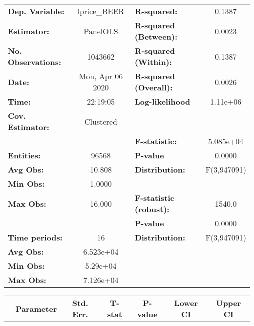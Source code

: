 \documentclass{report}
\begin{document}
\begin{center}
\begin{tabular}{lclc}
\toprule
\textbf{Dep. Variable:}    &    lprice\_BEER    & \textbf{  R-squared:         }   &      0.1387      \\
\textbf{Estimator:}        &      PanelOLS      & \textbf{  R-squared (Between):}  &      0.0023      \\
\textbf{No. Observations:} &      1043662       & \textbf{  R-squared (Within):}   &      0.1387      \\
\textbf{Date:}             &  Mon, Apr 06 2020  & \textbf{  R-squared (Overall):}  &      0.0026      \\
\textbf{Time:}             &      22:19:05      & \textbf{  Log-likelihood     }   &     1.11e+06     \\
\textbf{Cov. Estimator:}   &     Clustered      & \textbf{                     }   &                  \\
\textbf{}                  &                    & \textbf{  F-statistic:       }   &    5.085e+04     \\
\textbf{Entities:}         &       96568        & \textbf{  P-value            }   &      0.0000      \\
\textbf{Avg Obs:}          &       10.808       & \textbf{  Distribution:      }   &   F(3,947091)    \\
\textbf{Min Obs:}          &       1.0000       & \textbf{                     }   &                  \\
\textbf{Max Obs:}          &       16.000       & \textbf{  F-statistic (robust):} &      1540.0      \\
\textbf{}                  &                    & \textbf{  P-value            }   &      0.0000      \\
\textbf{Time periods:}     &         16         & \textbf{  Distribution:      }   &   F(3,947091)    \\
\textbf{Avg Obs:}          &     6.523e+04      & \textbf{                     }   &                  \\
\textbf{Min Obs:}          &      5.29e+04      & \textbf{                     }   &                  \\
\textbf{Max Obs:}          &     7.126e+04      & \textbf{                     }   &                  \\
\bottomrule
\end{tabular}
\begin{tabular}{lcccccc}
                           & \textbf{Parameter} & \textbf{Std. Err.} & \textbf{T-stat} & \textbf{P-value} & \textbf{Lower CI} & \textbf{Upper CI}  \\

\end{tabular}
\end{center}
\end{document}
